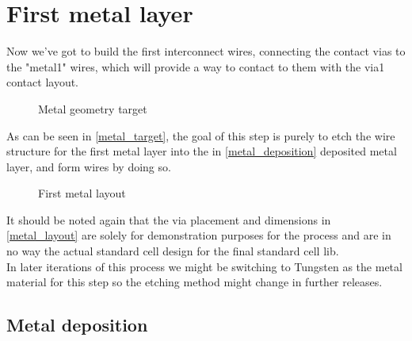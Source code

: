 \section{First metal layer}\label{metal}

Now we've got to build the first interconnect wires, connecting the contact vias to the "metal1" wires, which will provide a way to contact to them with the via1 contact layout.

\begin{figure}[H]
	\centering
	\begin{tikzpicture}[node distance = 3cm, auto, thick,scale=\CrossAndTopSectionBig, every node/.style={transform shape}]
		
	\end{tikzpicture}
	\begin{tikzpicture}[node distance = 3cm, auto, thick,scale=\CrossAndTopSectionBig, every node/.style={transform shape}]
		
	\end{tikzpicture}
	\caption{Metal geometry target}
	\label{metal_target}
\end{figure}

As can be seen in \autoref{metal_target}, the goal of this step is purely to etch the wire structure for the first metal layer into the in \autoref{metal_deposition} deposited metal layer, and form wires by doing so.

\begin{figure}[H]
	\centering
	\begin{tikzpicture}[node distance =1cm, auto, thick,scale=\VLSILayout, every node/.style={transform shape}]
		
	\end{tikzpicture}
	\caption{First metal layout}
	\label{metal_layout}
\end{figure}

It should be noted again that the via placement and dimensions in \autoref{metal_layout} are solely for demonstration purposes for the process and are in no way the actual standard cell design for the final standard cell lib. \\

In later iterations of this process we might be switching to Tungsten as the metal material for this step so the etching method might change in further releases.

\newpage

\subsection{Metal deposition}\label{metal_deposition}

